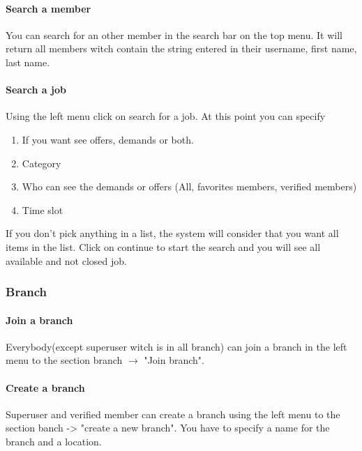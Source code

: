 \documentclass[11pt, a4paper]{article}      %
\begin{document}
\paragraph{Search a member}
You can search for an other member in the search bar on the top menu. It will return all members witch contain the string entered in their username, first name, last name.

\paragraph{Search a job}
Using the left menu click on search for a job. At this point you can specify 
\begin{enumerate}
    \item If you want see offers, demands or both.
    \item Category
    \item Who can see the demands or offers (All, favorites members, verified members)
    \item Time slot
\end{enumerate}
If you don't pick anything in a list, the system will consider that you want all items in the list.
Click on continue to start the search and you will see all available and not closed job.

\subsubsection{Branch}

\paragraph{Join a branch}
Everybody(except superuser witch is in all branch) can join a branch in the left menu to the section branch $\to$ "Join branch".

\paragraph{Create a branch}
Superuser and verified member can create a branch using the left menu to the section banch -> "create a new branch". You have to specify a name for the branch and a location.
\end{document}

